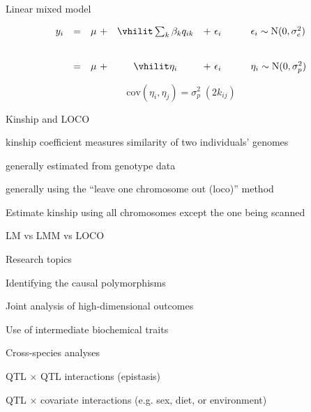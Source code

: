 \documentclass[aspectratio=169,12pt,t]{beamer}
\begin{document}
\begin{frame}[c]{Linear mixed model}



$$\begin{array}{lllcl@{\quad \qquad}l}
  y_i & = & \mu \ + & \textstyle{{\vhilit \sum_k \beta_k q_{ik}}} & +
  \ \epsilon_i
               & \epsilon_i \sim \text{N}(0, \sigma^2_e) \\[24pt]
  & = & \mu \ + & {\vhilit \eta_i} & + \ \epsilon_i & \eta_i \sim \text{N}(0, \sigma^2_p)
\end{array}$$

\vspace{10mm}

$$\text{cov}(\eta_i, \eta_j) = \sigma^2_p \; (2 k_{ij})$$

\end{frame}



\begin{frame}{Kinship and LOCO}

  \bbi
  \item kinship coefficient measures similarity of two individuals'
    genomes
  \item generally estimated from genotype data
  \item generally using the ``leave one chromosome out (loco)'' method
    \bi
    \item Estimate kinship using all chromosomes except the one being
      scanned
   \ei
   \ei
\end{frame}



\begin{frame}[c]{LM vs LMM vs LOCO}
\end{frame}



\begin{frame}{Research topics}

  \bbi
\item Identifying the causal polymorphisms
\item Joint analysis of high-dimensional outcomes
\item Use of intermediate biochemical traits
\item Cross-species analyses
\item QTL $\times$ QTL interactions {\lolit (epistasis)}
\item QTL $\times$ covariate interactions {\lolit (e.g. sex, diet, or environment)}
  \ei

\end{frame}
\end{document}
